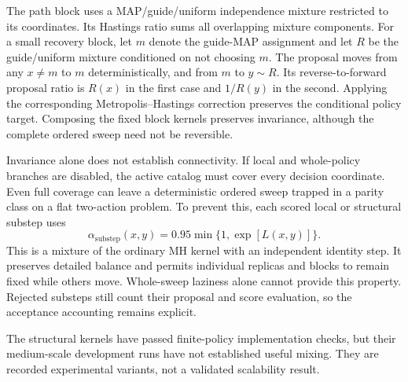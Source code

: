 The path block uses a MAP/guide/uniform independence mixture restricted to its
coordinates. Its Hastings ratio sums all overlapping mixture components.
For a small recovery block, let $m$ denote the guide-MAP assignment and let
$R$ be the guide/uniform mixture conditioned on not choosing $m$.
The proposal moves from any $x\ne m$ to $m$ deterministically, and from
$m$ to $y\sim R$. Its reverse-to-forward proposal ratio is $R(x)$ in
the first case and $1/R(y)$ in the second. Applying the corresponding
Metropolis--Hastings correction preserves the conditional policy target.
Composing the fixed block kernels preserves invariance, although the
complete ordered sweep need not be reversible.

Invariance alone does not establish connectivity. If local and whole-policy
branches are disabled, the active catalog must cover every decision
coordinate. Even full coverage can leave a deterministic ordered sweep
trapped in a parity class on a flat two-action problem. To prevent this,
each scored local or structural substep uses
\[
  \alpha_{\mathrm{substep}}(x,y)
  =0.95\min\{1,\exp[L(x,y)]\}.
\]
This is a mixture of the ordinary MH kernel with an independent identity
step. It preserves detailed balance and permits individual replicas and
blocks to remain fixed while others move. Whole-sweep laziness alone cannot
provide this property. Rejected substeps still count their proposal and
score evaluation, so the acceptance accounting remains explicit.

The structural kernels have passed finite-policy implementation checks, but
their medium-scale development runs have not established useful mixing.
They are recorded experimental variants, not a validated scalability result.



